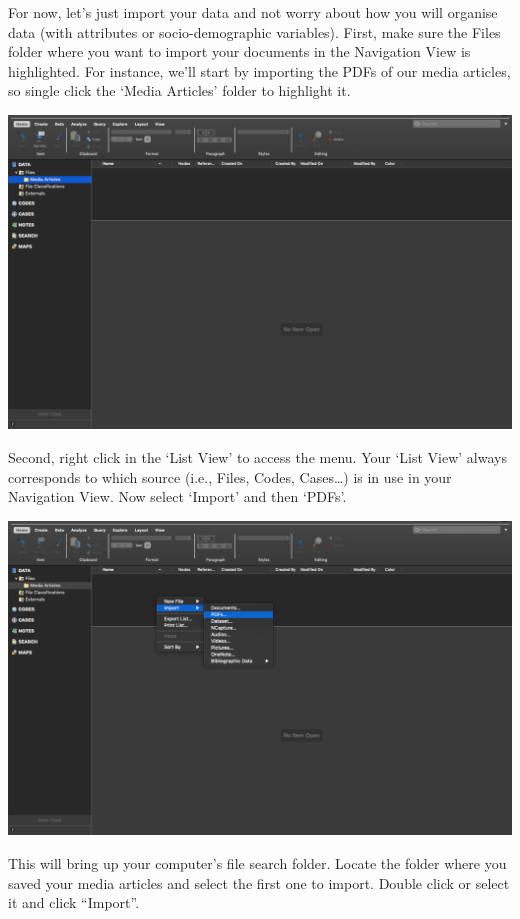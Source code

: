 \documentclass[
]{book}
\begin{document}
For now, let's just import your data and not worry about how you will organise data (with attributes or socio-demographic variables). First, make sure the Files folder where you want to import your documents in the Navigation View is highlighted. For instance, we'll start by importing the PDFs of our media articles, so single click the `Media Articles' folder to highlight it.

\includegraphics{imgs/media_folder.png}

Second, right click in the `List View' to access the menu. Your `List View' always corresponds to which source (i.e., Files, Codes, Cases\ldots) is in use in your Navigation View. Now select `Import' and then `PDFs'.

\includegraphics{imgs/import_pdf.png}

This will bring up your computer's file search folder. Locate the folder where you saved your media articles and select the first one to import. Double click or select it and click ``Import''.
\end{document}
